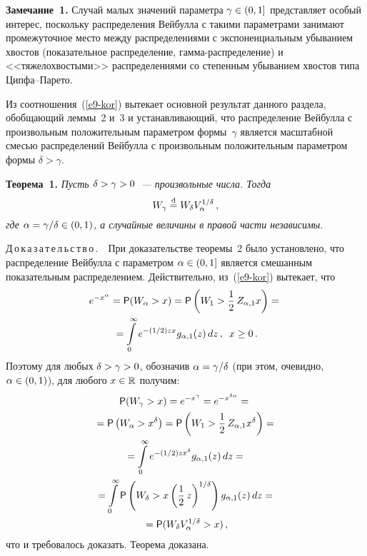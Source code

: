 \begin{multicols}{2}
\smallskip

\noindent
\textbf{Замечание~1.} Случай малых значений параметра $\gamma\hm\in(0,1]$
представляет особый интерес, поскольку распределения Вейбулла с
такими параметрами за\-ни\-ма\-ют промежуточное место между
распределениями с экспоненциальным убыванием хвостов (показательное
распределение, гам\-ма-рас\-пре\-де\-ле\-ние) и <<тяжелохвостыми>>
распределениями со степенным убыванием хвостов типа Цип\-фа--Па\-ре\-то.

\smallskip

Из соотношения~(\ref{e9-kor}) вытекает основной результат данного раздела,
обобщающий леммы~2 и~3 и устанавливающий, что распределение Вейбулла
с произвольным положительным параметром формы~$\gamma$ является
масштабной смесью распределений Вейбулла с произвольным
положительным па\-ра\-мет\-ром формы $\delta>\gamma$.

\smallskip

\noindent
\textbf{Теорема~1.} \textit{Пусть $\delta\hm>\gamma\hm>0$~--- произвольные числа.
Тогда
$$
W_{\gamma}\stackrel{\mathrm{d}}{=} W_{\delta} V_{\alpha}^{1/\delta}\,,
$$
где $\alpha\hm=\gamma/\delta\in(0,1)$, а случайные величины в правой
части независимы}.

\smallskip

\noindent
Д\,о\,к\,а\,з\,а\,т\,е\,л\,ь\,с\,т\,в\,о\,.\ \
При доказательстве теоремы~2 было установлено,
что распределение Вейбулла с параметром $\alpha\hm\in(0,1]$ является
смешанным показательным распределением. Действительно, из~(\ref{e9-kor})
вытекает, что
\begin{multline*}
e^{-x^{\alpha}}={\sf P}(W_{\alpha}>x)={\sf P}
\left(W_1>\displaystyle\frac{\displaystyle 1\mathstrut}{\displaystyle 2\mathstrut}\,Z_{\alpha,1}x\right)={}\\
{}= \int\limits_{0}^{\infty}
e^{-(1/2)zx}g_{\alpha,1}(z)\,dz\,,\enskip x\ge0\,.
\end{multline*}
Поэтому для любых $\delta\hm>\gamma\hm>0$, обозначив
$\alpha\hm=\gamma/\delta$ (при этом, очевидно, $\alpha\hm\in(0,1)$), для
любого $x\hm\in\mathbb{R}$ получим:
\begin{multline*}
{\sf P}(W_{\gamma}>x)=e^{-x^{\gamma}}=e^{-x^{\delta\alpha}}={}\\
{}=
{\sf P}\left(W_{\alpha}>x^{\delta}\right)=
{\sf P}\left(W_1>\displaystyle\frac{\displaystyle 1\mathstrut}{\displaystyle 2\mathstrut}\,Z_{\alpha,1}x^{\delta}\right)={}\\
{}
=\int\limits_{0}^{\infty}e^{-(1/2) zx^{\delta}}
g_{\alpha,1}(z)\,dz={}\\
{}=\int\limits_{\!\!0}^{\infty}
{\sf P}\left(W_{\delta}>x\left(\displaystyle\frac{\displaystyle 1\mathstrut}{\displaystyle 2\mathstrut}\,z\right)^{1/\delta}\right)
g_{\alpha,1}(z)\,dz={}\\
{}=
{\sf P}(W_{\delta} V_{\alpha}^{1/\delta}>x)\,,
\end{multline*}
что и требовалось доказать. Теорема доказана.


\end{multicols}
